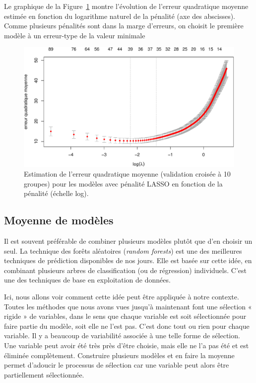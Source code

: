 \documentclass[
  11pt,
  letterpaper,
]{book}
\theoremstyle{definition}
\theoremstyle{remark}
\begin{document}
Le graphique de la Figure~\ref{fig-lassopath} montre l'évolution de
l'erreur quadratique moyenne estimée en fonction du logarithme naturel
de la pénalité (axe des abscisses). Comme plusieurs pénalités sont dans
la marge d'erreurs, on choisit le première modèle à un erreur-type de la
valeur minimale

\begin{figure}[ht!]

{\centering \includegraphics[width=1\textwidth,height=\textheight]{./04-selectionmodeles_files/figure-pdf/fig-lassopath-1.pdf}

}

\caption{\label{fig-lassopath}Estimation de l'erreur quadratique moyenne
(validation croisée à 10 groupes) pour les modèles avec pénalité LASSO
en fonction de la pénalité (échelle log).}

\end{figure}

\hypertarget{moyenne-de-moduxe8les}{%
\subsection{Moyenne de modèles}\label{moyenne-de-moduxe8les}}

Il est souvent préférable de combiner plusieurs modèles plutôt que d'en
choisir un seul. La technique des forêts aléatoires (\emph{random
forests}) est une des meilleures techniques de prédiction disponibles de
nos jours. Elle est basée sur cette idée, en combinant plusieurs arbres
de classification (ou de régression) individuels. C'est une des
techniques de base en exploitation de données.

Ici, nous allons voir comment cette idée peut être appliquée à notre
contexte. Toutes les méthodes que nous avons vues jusqu'à maintenant
font une sélection « rigide » de variables, dans le sens que chaque
variable est soit sélectionnée pour faire partie du modèle, soit elle ne
l'est pas. C'est donc tout ou rien pour chaque variable. Il y a beaucoup
de variabilité associée à une telle forme de sélection. Une variable
peut avoir été très près d'être choisie, mais elle ne l'a pas été et est
éliminée complètement. Construire plusieurs modèles et en faire la
moyenne permet d'adoucir le processus de sélection car une variable peut
alors être partiellement sélectionnée.
\end{document}
